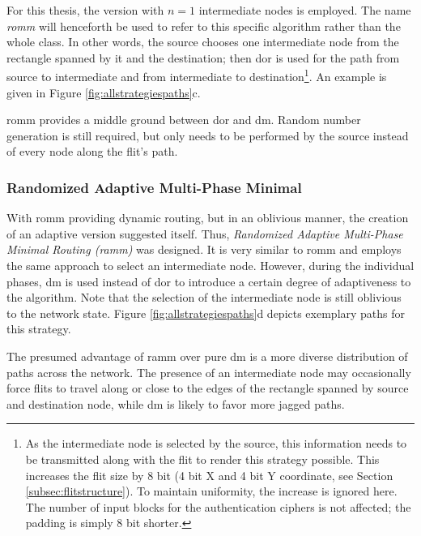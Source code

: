 For this thesis, the version with $n = 1$ intermediate nodes is employed. The name \textit{\gls{romm}} will henceforth be used to refer to this
specific algorithm rather than the whole class. In other words, the source chooses one intermediate node from the rectangle spanned by it and
the destination; then \gls{dor} is used for the path from source to intermediate and from intermediate to destination\footnote{As the intermediate
node is selected by the source, this information needs to be transmitted along with the flit to render this strategy possible. This increases the flit
size by 8 bit (4 bit X and 4 bit Y coordinate, see Section \ref{subsec:flitstructure}). To maintain uniformity, the increase is ignored here. The
number of input blocks for the authentication ciphers is not affected; the padding is simply 8 bit shorter.}. An example is given in Figure
\ref{fig:allstrategiespaths}c.

\Gls{romm} provides a middle ground between \gls{dor} and \gls{dm}. Random number generation is still required, but only needs to be performed by the
source instead of every node along the flit's path.

\subsubsection{Randomized Adaptive Multi-Phase Minimal}\label{subsubsec:ramm}
With \gls{romm} providing dynamic routing, but in an oblivious manner, the creation of an adaptive version suggested itself. Thus, \textit{Randomized
Adaptive Multi-Phase Minimal Routing (\gls{ramm})} was designed. It is very similar to \gls{romm} and employs the same approach to select an
intermediate node. However, during the individual phases, \gls{dm} is used instead of \gls{dor} to introduce a certain degree of adaptiveness to the
algorithm. Note that the selection of the intermediate node is still oblivious to the network state. Figure \ref{fig:allstrategiespaths}d depicts
exemplary paths for this strategy.

The presumed advantage of \gls{ramm} over pure \gls{dm} is a more diverse distribution of paths across the network. The presence of an intermediate
node may occasionally force flits to travel along or close to the edges of the rectangle spanned by source and destination node, while \gls{dm} is
likely to favor more jagged paths.

